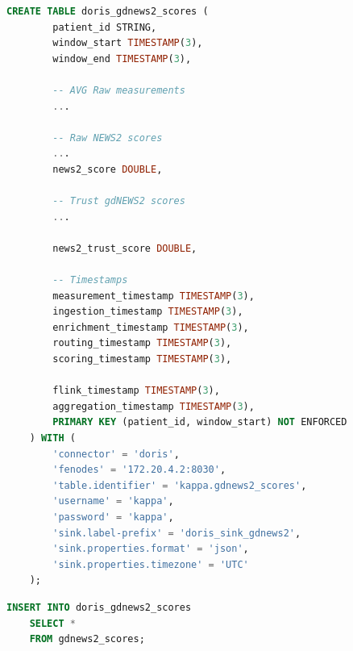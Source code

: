 \begin{lstlisting}[language=SQL]
    CREATE TABLE doris_gdnews2_scores (
        patient_id STRING,
        window_start TIMESTAMP(3),
        window_end TIMESTAMP(3),

        -- AVG Raw measurements
        ...

        -- Raw NEWS2 scores
        ...
        news2_score DOUBLE,

        -- Trust gdNEWS2 scores
        ...

        news2_trust_score DOUBLE,

        -- Timestamps
        measurement_timestamp TIMESTAMP(3),
        ingestion_timestamp TIMESTAMP(3),
        enrichment_timestamp TIMESTAMP(3),
        routing_timestamp TIMESTAMP(3),
        scoring_timestamp TIMESTAMP(3),

        flink_timestamp TIMESTAMP(3),
        aggregation_timestamp TIMESTAMP(3),
        PRIMARY KEY (patient_id, window_start) NOT ENFORCED
    ) WITH (
        'connector' = 'doris',
        'fenodes' = '172.20.4.2:8030',
        'table.identifier' = 'kappa.gdnews2_scores',
        'username' = 'kappa',
        'password' = 'kappa',
        'sink.label-prefix' = 'doris_sink_gdnews2',
        'sink.properties.format' = 'json',
        'sink.properties.timezone' = 'UTC'
    );
\end{lstlisting}

\begin{lstlisting}[language=SQL]
    INSERT INTO doris_gdnews2_scores
    SELECT *
    FROM gdnews2_scores;
\end{lstlisting}